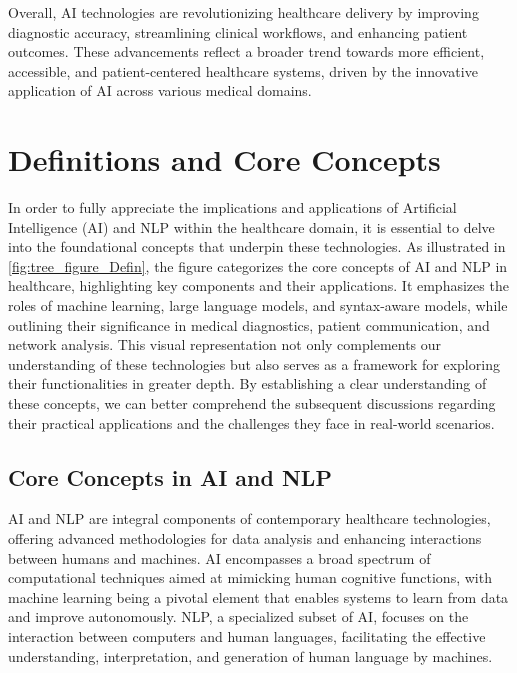 Overall, AI technologies are revolutionizing healthcare delivery by improving diagnostic accuracy, streamlining clinical workflows, and enhancing patient outcomes. These advancements reflect a broader trend towards more efficient, accessible, and patient-centered healthcare systems, driven by the innovative application of AI across various medical domains.








\section{Definitions and Core Concepts} \label{sec:Definitions and Core Concepts}


In order to fully appreciate the implications and applications of Artificial Intelligence (AI) and NLP within the healthcare domain, it is essential to delve into the foundational concepts that underpin these technologies. As illustrated in \autoref{fig:tree_figure_Defin}, the figure categorizes the core concepts of AI and NLP in healthcare, highlighting key components and their applications. It emphasizes the roles of machine learning, large language models, and syntax-aware models, while outlining their significance in medical diagnostics, patient communication, and network analysis. This visual representation not only complements our understanding of these technologies but also serves as a framework for exploring their functionalities in greater depth. By establishing a clear understanding of these concepts, we can better comprehend the subsequent discussions regarding their practical applications and the challenges they face in real-world scenarios.


 






\subsection{Core Concepts in AI and NLP} \label{subsec:Core Concepts in AI and NLP}

AI and NLP are integral components of contemporary healthcare technologies, offering advanced methodologies for data analysis and enhancing interactions between humans and machines. AI encompasses a broad spectrum of computational techniques aimed at mimicking human cognitive functions, with machine learning being a pivotal element that enables systems to learn from data and improve autonomously. NLP, a specialized subset of AI, focuses on the interaction between computers and human languages, facilitating the effective understanding, interpretation, and generation of human language by machines.

